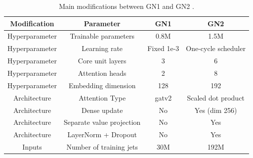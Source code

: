 \begin{table}[h]
  \begin{center}
      \begin{tabular}{c|c|c|c} 
      	 \hline \hline
          Modification & Parameter & GN1 & GN2 \\ \hline
          Hyperparameter  & Trainable parameters & 0.8M & 1.5M \\ 
          Hyperparameter  & Learning rate & Fixed 1e-3 & One-cycle scheduler\\ 
          Hyperparameter  & Core unit layers & 3 & 6 \\ 
          Hyperparameter  & Attention heads & 2 & 8 \\ 
          Hyperparameter  & Embedding dimension & 128 & 192 \\ \hline
          Architecture    & Attention Type & \gls{gat}v2 & Scaled dot product \\ 
          Architecture    & Dense update & No & Yes (dim 256) \\ 
          Architecture    & Separate value projection & No & Yes \\ 
          Architecture    & LayerNorm + Dropout & No & Yes \\ \hline
          Inputs          & Number of training jets & 30M & 192M  \\ \hline \hline
      \end{tabular}
    \caption{Main modifications between GN1 and GN2 \cite{ATL-PLOT-FTAG-2023-01}.}
    \label{tab:gn2compGN1}
  \end{center}
\end{table}

